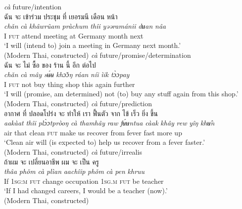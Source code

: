 \documentclass[output=paper,colorlinks,citecolor=brown]{langscibook}
\begin{document}
\ea \label{ex:5} 
    \ea \label{ex:5a} \textit{cà} future/intention\\
        \textthai{ฉัน} \textthai{จะ} \textthai{เข้าร่วม} \textthai{ประชุม} \textthai{ที่} \textthai{เยอรมนี} \textthai{เดือน} \textthai{หน้า}\\
        \gll \textit{chǎn} \textit{cà} \textit{khâwrûam} \textit{pràchum} \textit{thîi} \textit{yəəramánii} \textit{dʉan} \textit{nâa}\\
        I \textsc{fut} attend meeting at Germany month next\\
        \glt ‘I will (intend to) join a meeting in Germany next month.’ \\
        \hfill (Modern Thai, constructed)
    \ex \label{ex:5b} \textit{cà} future/promise/determination\\
        \textthai{ฉัน} \textthai{จะ} \textthai{ไม่} \textthai{ซื้อ} \textthai{ของ} \textthai{ร้าน} \textthai{นี้} \textthai{อีก} \textthai{ต่อไป}\\
        \gll \textit{chǎn} \textit{cà} \textit{mây} \textit{sʉ́ʉ} \textit{khɔ̌ɔŋ} \textit{ráan} \textit{níi} \textit{ìik} \textit{tɔ̀ɔpay}\\
        I \textsc{fut} not buy thing shop this again further\\
        \glt ‘I will (promise, am determined) not (to) buy any stuff again from this shop.’ \\
        \hfill (Modern Thai, constructed)
    \ex \label{ex:5c} \textit{cà} future/prediction\\
        \textthai{อากาศ} \textthai{ที่} \textthai{ปลอดโปร่ง} \textthai{จะ} \textthai{ทำให้} \textthai{เรา} \textthai{ฟื้นตัว} \textthai{จาก} \textthai{ไข้} \textthai{เร็ว} \textthai{ยิ่ง} \textthai{ขึ้น}\\
        \gll \textit{aakàat} \textit{thîi} \textit{plɔ̀ɔtpròoŋ} \textit{cà} \textit{thamhây} \textit{raw} \textit{fʉ́ʉntua} \textit{càak} \textit{khây} \textit{rew} \textit{yîŋ} \textit{khʉ̂n}\\
        air that clean \textsc{fut} make us recover from fever fast more up\\
        \glt ‘Clean air will (is expected to) help us recover from a fever faster.’ \\
        \hfill (Modern Thai, constructed)
    \ex \label{ex:5d} \textit{cà} future/irrealis\\
        \textthai{ถ้าผม} \textthai{จะ} \textthai{เปลี่ยนอาชีพ} \textthai{ผม} \textthai{จะ} \textthai{เป็น} \textthai{ครู}\\
        \gll \textit{thâa} \textit{phǒm} \textit{cà} \textit{plìan} \textit{aachîip} \textit{phǒm} \textit{cà} \textit{pen} \textit{khruu}\\
        If \textsc{1sg:m} \textsc{fut} change occupation \textsc{1sg.m} \textsc{fut} be teacher\\
        \glt ‘If I had changed careers, I would be a teacher (now).’ \\
        \hfill (Modern Thai, constructed)
    \z
\z
\end{document}
